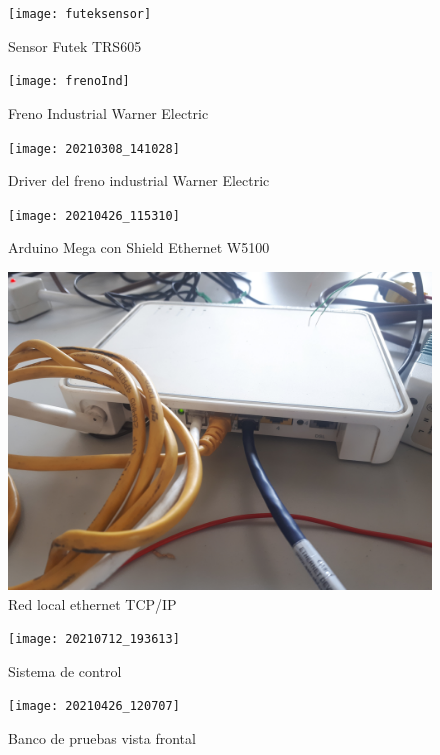 \documentclass[12pt,titlepage]{article}
\begin{document}
\begin{figure}[H]
\hspace*{5.7cm} 
\texttt{[image: futeksensor]}
\caption{Sensor Futek TRS605}
\end{figure}
\begin{figure}[H]
\hspace*{2.8cm} 
\texttt{[image: frenoInd]}
\caption{Freno Industrial Warner Electric}
\end{figure}
\newpage
\begin{figure}[H]
\hspace*{4.2cm} 
\texttt{[image: 20210308\_141028]}
\caption{Driver del freno industrial Warner Electric}
\end{figure}

\begin{figure}[H]
\hspace*{2.1cm} 
\texttt{[image: 20210426\_115310]}
\caption{Arduino Mega con Shield Ethernet W5100}
\end{figure}
\newpage

\begin{figure}[H]
\hspace*{2.6cm} 
\includegraphics[scale=0.075]{20210426_115257}
\caption{Red local ethernet TCP/IP}
\end{figure}

\begin{figure}[H]
\hspace*{2.6cm} 
\texttt{[image: 20210712\_193613]}
\caption{Sistema de control}
\end{figure}
\newpage
\begin{figure}[H]
\hspace*{2.1cm} 
\texttt{[image: 20210426\_120707]}
\caption{Banco de pruebas vista frontal}
\end{figure}
\end{document}
